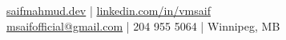 {
  \href{https://saifmahmud.dev}{saifmahmud.dev} | \href{https://www.linkedin.com/in/vmsaif/}{linkedin.com/in/vmsaif}\\
  \href{mailto:msaifofficial@gmail.com}{msaifofficial@gmail.com} | 204 955 5064 | Winnipeg, MB
}
